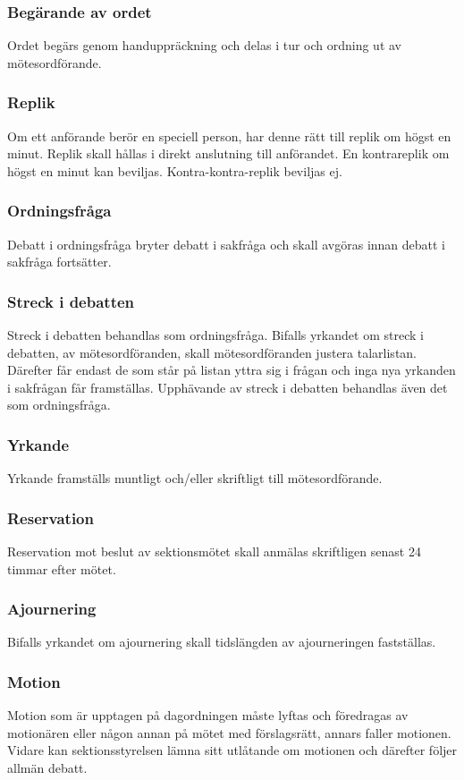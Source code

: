 \subsubsection{Begärande av ordet}
Ordet begärs genom handuppräckning och delas i tur och ordning ut av
mötesordförande.
  
\subsubsection{Replik}
Om ett anförande berör en speciell person, har denne rätt till replik om högst
en minut. Replik skall hållas i direkt anslutning till anförandet. En kontrareplik
om högst en minut kan beviljas. Kontra-kontra-replik beviljas ej.
 
\subsubsection{Ordningsfråga}
Debatt i ordningsfråga bryter debatt i sakfråga och skall avgöras innan debatt
i sakfråga fortsätter.

\subsubsection{Streck i debatten}
Streck i debatten behandlas som ordningsfråga. Bifalls yrkandet om streck i
debatten, av mötesordföranden, skall mötesordföranden justera talarlistan.
Därefter får endast de som står på listan yttra sig i frågan och inga nya
yrkanden i sakfrågan får framställas. Upphävande av streck i debatten
behandlas även det som ordningsfråga.
 
\subsubsection{Yrkande}
Yrkande framställs muntligt och/eller skriftligt till mötesordförande.

\subsubsection{Reservation}
Reservation mot beslut av sektionsmötet skall anmälas skriftligen senast 24
timmar efter mötet.
 
\subsubsection{Ajournering}
Bifalls yrkandet om ajournering skall tidslängden av ajourneringen fastställas.

\subsubsection{Motion}
Motion som är upptagen på dagordningen måste lyftas och föredragas av
motionären eller någon annan på mötet med förslagsrätt, annars faller
motionen. Vidare kan sektionsstyrelsen lämna sitt utlåtande om motionen och
därefter följer allmän debatt.

